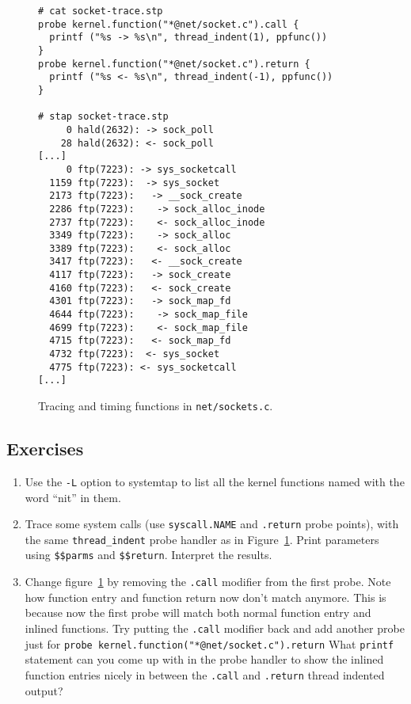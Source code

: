 \documentclass{article}
\newenvironment{boxedminipage}%
    {\begin{makeimage}\begin{center}\begin{Sbox}\begin{minipage}}%
    {\end{minipage}\end{Sbox}\fbox{\TheSbox}\end{center}\end{makeimage}}
\begin{document}
\begin{figure}[!ht]
\begin{boxedminipage}{4.5in}
\begin{verbatim}
# cat socket-trace.stp
probe kernel.function("*@net/socket.c").call {
  printf ("%s -> %s\n", thread_indent(1), ppfunc())
}
probe kernel.function("*@net/socket.c").return {
  printf ("%s <- %s\n", thread_indent(-1), ppfunc())
}

# stap socket-trace.stp
     0 hald(2632): -> sock_poll
    28 hald(2632): <- sock_poll
[...]
     0 ftp(7223): -> sys_socketcall
  1159 ftp(7223):  -> sys_socket
  2173 ftp(7223):   -> __sock_create
  2286 ftp(7223):    -> sock_alloc_inode
  2737 ftp(7223):    <- sock_alloc_inode
  3349 ftp(7223):    -> sock_alloc
  3389 ftp(7223):    <- sock_alloc
  3417 ftp(7223):   <- __sock_create
  4117 ftp(7223):   -> sock_create
  4160 ftp(7223):   <- sock_create
  4301 ftp(7223):   -> sock_map_fd
  4644 ftp(7223):    -> sock_map_file
  4699 ftp(7223):    <- sock_map_file
  4715 ftp(7223):   <- sock_map_fd
  4732 ftp(7223):  <- sys_socket
  4775 ftp(7223): <- sys_socketcall
[...]
\end{verbatim}
\end{boxedminipage}
\caption{Tracing and timing functions in {\tt net/sockets.c}.}
\label{fig:socket-trace}
\end{figure}

\subsection{Exercises}

\begin{enumerate}
\item Use the \verb+-L+ option to systemtap to list all the kernel
  functions named with the word ``nit'' in them.

\item Trace some system calls (use \verb+syscall.NAME+ and
  \verb+.return+ probe points), with the same \verb+thread_indent+
  probe handler as in Figure~\ref{fig:socket-trace}.  Print parameters
  using \verb+$$parms+ and \verb+$$return+.  Interpret the results.

\item Change figure~\ref{fig:socket-trace} by removing the \verb+.call+
  modifier from the first probe.  Note how function entry and function
  return now don't match anymore.  This is because now the first probe
  will match both normal function entry and inlined functions.  Try
  putting the \verb+.call+ modifier back and add another probe just for
  \verb+probe kernel.function("*@net/socket.c").return+
  What \verb+printf+ statement can you come up with in the probe handler
  to show the inlined function entries nicely in between the \verb+.call+
  and \verb+.return+ thread indented output?

\end{enumerate}
\end{document}
